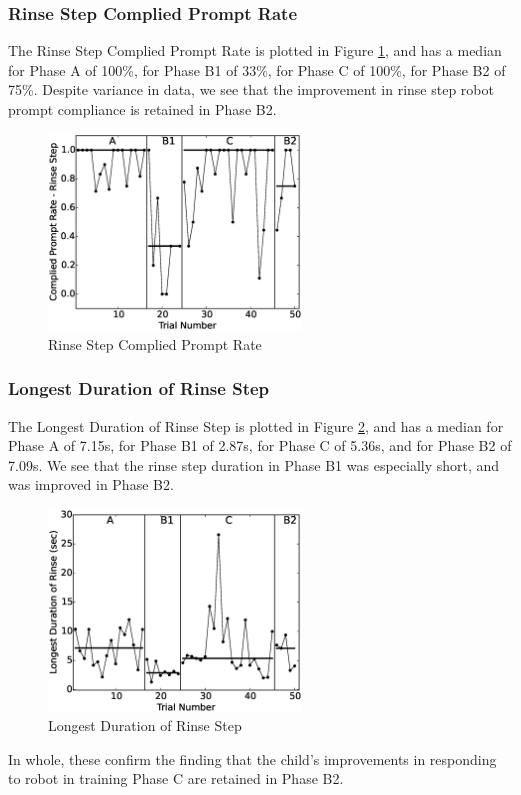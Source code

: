 \subsubsection{Rinse Step Complied Prompt Rate}
The Rinse Step Complied Prompt Rate is plotted in Figure \ref{fig:5CompliedPromptRate-RinseStep}, and has a median for Phase A of 100\%, for Phase B1 of 33\%, for Phase C of 100\%, for Phase B2 of 75\%.  Despite variance in data, we see that the improvement in rinse step robot prompt compliance is retained in Phase B2.
\begin{figure} [H]
	\centering
	\includegraphics[width=0.6\textwidth]{./img/data_analysis/5CompliedPromptRate-RinseStep.eps}
	\caption{Rinse Step Complied Prompt Rate}
	\label{fig:5CompliedPromptRate-RinseStep}
\end{figure}

\subsubsection{Longest Duration of Rinse Step}
The Longest Duration of Rinse Step is plotted in Figure \ref{fig:8LongestDurationofRinsesec}, and has a median for Phase A of 7.15s, for Phase B1 of 2.87s, for Phase C of 5.36s, and for Phase B2 of 7.09s.  We see that the rinse step duration in Phase B1 was especially short, and was improved in Phase B2.
\begin{figure} [H]
	\centering
	\includegraphics[width=0.6\textwidth]{./img/data_analysis/8LongestDurationofRinsesec.eps}
	\caption{Longest Duration of Rinse Step}
	\label{fig:8LongestDurationofRinsesec}
\end{figure}
In whole, these confirm the finding that the child's improvements in responding to robot in training Phase C are retained in Phase B2.

